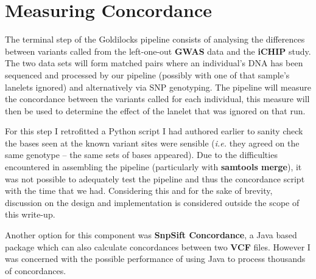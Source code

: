 \section{Measuring Concordance}

The terminal step of the Goldilocks pipeline consists of analysing the
differences between variants called from the left-one-out \textbf{GWAS} data and
the \textbf{iCHIP} study. The two data sets will form matched pairs where an
individual's DNA has been sequenced and processed by our pipeline (possibly with
one of that sample's lanelets ignored) and alternatively via SNP genotyping.
The pipeline will measure the concordance between the variants called for each
individual, this measure will then be used to determine the effect of the
lanelet that was ignored on that run.

For this step I retrofitted a Python script I had authored earlier to sanity
check the bases seen at the known variant sites were sensible (\textit{i.e.}
they agreed on the same genotype -- the same sets of bases appeared).  Due to
the difficulties encountered in assembling the pipeline (particularly with
\textbf{samtools merge}), it was not possible to adequately test the pipeline
and thus the concordance script with the time that we had. Considering this and
for the sake of brevity, discussion on the design and implementation is
considered outside the scope of this write-up.

Another option for this component was \textbf{SnpSift
Concordance}\citep{snpeff-concordance}, a Java based package which can also
calculate concordances between two \textbf{VCF} files. However I was concerned
with the possible performance of using Java to process thousands of
concordances.

